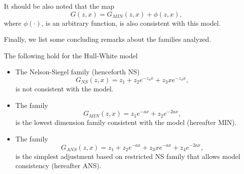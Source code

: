 It should be also noted that the map 
$$
G(z,x)=G_{MIN}(z,x)+\phi(z,x),
$$
where $\phi(\cdot)$, is an arbitrary function, is also consistent with this model.

Finally, we list some concluding remarks about the families analyzed.
\begin{lema}
The following hold for the Hull-White model 
\begin{itemize}
\item The Nelson-Siegel family (henceforth NS)
$$
G_{NS}(z,x)=z_1+z_2e^{-z_4 x}+z_3 x e^{-z_4 x},
$$
is not consistent with the model. %
\item The family 
$$
G_{MIN}(z,x)=z_1 e^{-a x}+z_2 e^{-2 a x},
$$
is the lowest dimension family consistent with the model (hereafter MIN).
\item The family
$$
G_{ANS}(z,x)=z_1+z_2e^{-a x}+z_3 x e^{-a x}+z_4 e^{-2 a x},
$$
is the simplest adjustment based on restricted NS family that allows model
consistency (hereafter ANS).
\end{itemize}
\end{lema}

